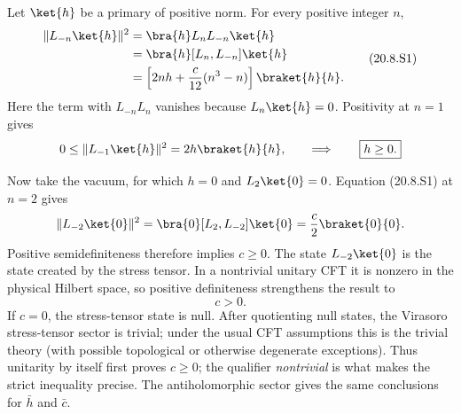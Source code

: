 \begin{enumerate}
  Let \(\ket{h}\) be a primary of positive norm.  For every positive
  integer \(n\),
  \[
    \begin{aligned}
      \|L_{-n}\ket{h}\|^2
        &=\bra{h}L_nL_{-n}\ket{h}\\
        &=\bra{h}[L_n,L_{-n}]\ket{h}\\
        &=\left[2nh+\frac{c}{12}(n^3-n)\right]
          \braket{h}{h} .
    \end{aligned}
    \tag{20.8.S1}
  \]
  Here the term with \(L_{-n}L_n\) vanishes because \(L_n\ket{h}=0\).
  Positivity at \(n=1\) gives
  \[
    0\leq\|L_{-1}\ket{h}\|^2
      =2h\braket{h}{h},
    \qquad\Longrightarrow\qquad
    \boxed{h\geq0.}
  \]

  Now take the vacuum, for which \(h=0\) and \(L_2\ket{0}=0\).
  Equation (20.8.S1) at \(n=2\) gives
  \[
    \|L_{-2}\ket{0}\|^2
      =\bra{0}[L_2,L_{-2}]\ket{0}
      =\frac{c}{2}\braket{0}{0}.
  \]
  Positive semidefiniteness therefore implies \(c\geq0\).  The state
  \(L_{-2}\ket{0}\) is the state created by the stress tensor.  In a
  nontrivial unitary CFT it is nonzero in the physical Hilbert space, so
  positive definiteness strengthens the result to
  \[
    \boxed{c>0.}
  \]
  If \(c=0\), the stress-tensor state is null.  After quotienting null
  states, the Virasoro stress-tensor sector is trivial; under the usual
  CFT assumptions this is the trivial theory (with possible
  topological or otherwise degenerate exceptions).  Thus unitarity by
  itself first proves \(c\geq0\); the qualifier \emph{nontrivial} is what
  makes the strict inequality precise.  The antiholomorphic sector gives
  the same conclusions for \(\bar h\) and \(\bar c\).


\end{enumerate}
